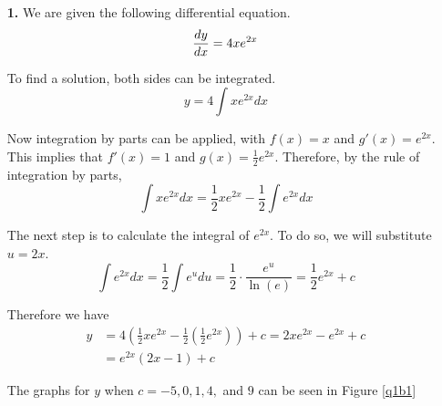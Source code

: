 
\begin{enumerate}
	\item[\textbf{1.}] %
		We are given the following differential equation.
		\[
			\frac{dy}{dx} = 4xe^{2x}
		\]

		To find a solution, both sides can be integrated.
		\[
			y = 4 \int xe^{2x} dx
		\]

		Now integration by parts can be applied, with \(f(x) = x\) and \(g'(x) = e^{2x}\). This implies that \(f'(x) = 1\) and \(g(x) = \frac{1}{2}e^{2x}\). Therefore, by the rule of integration by parts,
		\[
			\int xe^{2x} dx = \frac{1}{2}xe^{2x} - \frac{1}{2} \int e^{2x} dx
		\]

		The next step is to calculate the integral of \(e^{2x}\). To do so, we will substitute \(u = 2x\).
		\[
			\int e^{2x} dx = \frac{1}{2} \int e^u du = \frac{1}{2} \cdot \frac{e^u}{\ln(e)} = \frac{1}{2} e^{2x} + c
		\]

		Therefore we have
		\begin{align*}
			y & = 4 \left(\frac{1}{2}xe^{2x} - \frac{1}{2} \left(\frac{1}{2} e^{2x}\right)\right) + c = 2xe^{2x} - e^{2x} + c \\
			  & = e^{2x} (2x-1) + c
		\end{align*}

		The graphs for \(y\) when \(c = -5, 0, 1, 4,\) and \(9\) can be seen in Figure \ref{q1b1}

		\begin{figure}[htb]
			\centering
\end{figure}
\end{enumerate}
